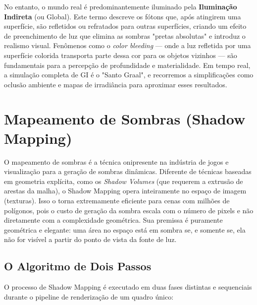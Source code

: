 No entanto, o mundo real é predominantemente iluminado pela \textbf{Iluminação Indireta} (ou Global). Este termo descreve os fótons que, após atingirem uma superfície, são refletidos ou refratados para outras superfícies, criando um efeito de preenchimento de luz que elimina as sombras "pretas absolutas" e introduz o realismo visual. Fenômenos como o \textit{color bleeding} — onde a luz refletida por uma superfície colorida transporta parte dessa cor para os objetos vizinhos — são fundamentais para a percepção de profundidade e materialidade. Em tempo real, a simulação completa de GI é o "Santo Graal", e recorremos a simplificações como oclusão ambiente e mapas de irradiância para aproximar esses resultados.

\section{Mapeamento de Sombras (Shadow Mapping)}

O mapeamento de sombras é a técnica onipresente na indústria de jogos e visualização para a geração de sombras dinâmicas. Diferente de técnicas baseadas em geometria explícita, como os \textit{Shadow Volumes} (que requerem a extrusão de arestas da malha), o Shadow Mapping opera inteiramente no espaço de imagem (texturas). Isso o torna extremamente eficiente para cenas com milhões de polígonos, pois o custo de geração da sombra escala com o número de pixels e não diretamente com a complexidade geométrica. Sua premissa é puramente geométrica e elegante: uma área no espaço está em sombra se, e somente se, ela não for visível a partir do ponto de vista da fonte de luz.

\subsection{O Algoritmo de Dois Passos}

O processo de Shadow Mapping é executado em duas fases distintas e sequenciais durante o pipeline de renderização de um quadro único:

